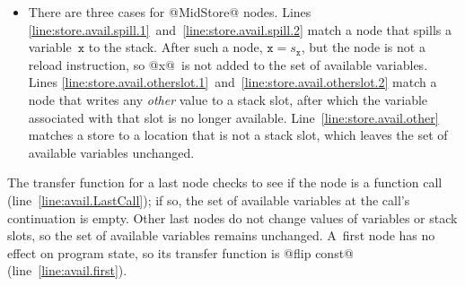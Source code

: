 \documentclass[blockstyle,preprint,natbib,nocopyrightspace]{sigplanconf}
\newcommand\lineref[1]{line~\ref{line:#1}}
\newcommand\Lineref[1]{Line~\ref{line:#1}}
\newcommand\Linepairref[2]{Lines \ref{line:#1}~and~\ref{line:#2}}
\newcommand\slotof[1]{\ensuremath{s_{#1}}}
\let\slotOf=\slotof
\def\authornote#1{\unskip\relax}
\newcommand{\simon}[1]{\authornote{SLPJ: #1}}
\newcommand{\norman}[1]{\authornote{NR: #1}}
\let\remark\norman
\newcommand{\john}[1]{\authornote{JD: #1}}
\begin{document}
\begin{itemize}
\item 
There are three cases for @MidStore@ nodes.
\Linepairref{store.avail.spill.1}{store.avail.spill.2}
match a node that spills a variable~$\mathtt{x}$ to the stack.
After such a node, $\mathtt{x} = \slotOf {\mathtt{x}}$,
but the node is not a reload instruction,
so @x@~is not added to the set of available variables.
%
\Linepairref{store.avail.otherslot.1}{store.avail.otherslot.2}
match a node that writes any \emph{other} value to a stack slot,
after which the variable associated with that slot is no longer available.
%
\Lineref{store.avail.other} matches a store to a location that is not
a stack slot, which leaves the set of available variables unchanged.
\end{itemize}


The transfer function for a last node checks to see if the node is a
function call (\lineref{avail.LastCall}); if so, the set of
available variables at the call's continuation is empty.
Other last nodes do not change values of variables or stack slots, 
so the set of available variables remains unchanged.
%
A~first node has no effect on program state, so its transfer function
is @flip const@ (\lineref{avail.first}).
\end{document}
